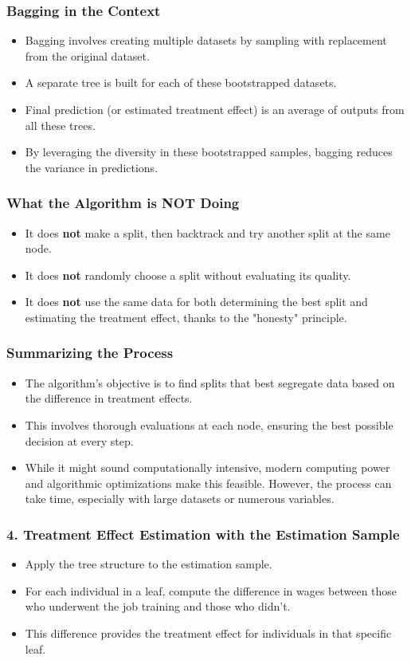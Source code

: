 \documentclass{beamer}
\begin{document}
\begin{frame}
\frametitle{Bagging in the Context}
\begin{itemize}
    \item Bagging involves creating multiple datasets by sampling with replacement from the original dataset.
    \item A separate tree is built for each of these bootstrapped datasets.
    \item Final prediction (or estimated treatment effect) is an average of outputs from all these trees.
    \item By leveraging the diversity in these bootstrapped samples, bagging reduces the variance in predictions.
\end{itemize}
\end{frame}

\begin{frame}
\frametitle{What the Algorithm is NOT Doing}
\begin{itemize}
    \item It does \textbf{not} make a split, then backtrack and try another split at the same node.
    \item It does \textbf{not} randomly choose a split without evaluating its quality.
    \item It does \textbf{not} use the same data for both determining the best split and estimating the treatment effect, thanks to the "honesty" principle.
\end{itemize}
\end{frame}

\begin{frame}
\frametitle{Summarizing the Process}
\begin{itemize}
    \item The algorithm's objective is to find splits that best segregate data based on the difference in treatment effects.
    \item This involves thorough evaluations at each node, ensuring the best possible decision at every step.
    \item While it might sound computationally intensive, modern computing power and algorithmic optimizations make this feasible. However, the process can take time, especially with large datasets or numerous variables.
\end{itemize}
\end{frame}

\begin{frame}
\frametitle{4. Treatment Effect Estimation with the Estimation Sample}
\begin{itemize}
    \item Apply the tree structure to the estimation sample.
    \item For each individual in a leaf, compute the difference in wages between those who underwent the job training and those who didn't.
    \item This difference provides the treatment effect for individuals in that specific leaf.
\end{itemize}
\end{frame}
\end{document}
